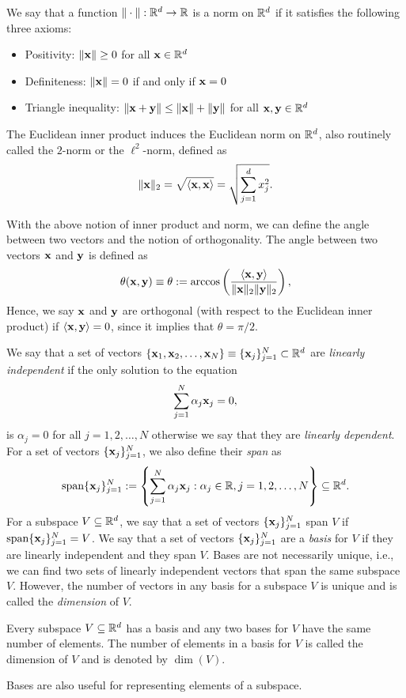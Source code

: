 \begin{definition}[Norm]
    We say that a function $\|\cdot\|: \mathbb{R}^d \to \mathbb{R}$ is a norm on $\mathbb{R}^d$ if it satisfies the following three axioms:
    \begin{itemize}
        \item Positivity: $\|\mathbf{x}\| \ge 0$ for all $\mathbf{x} \in \mathbb{R}^d$
        \item Definiteness: $\|\mathbf{x}\| = 0$ if and only if $\mathbf{x} = 0$
        \item Triangle inequality: $\|\mathbf{x} + \mathbf{y}\| \le \|\mathbf{x}\| + \|\mathbf{y}\|$ for all $\mathbf{x}, \mathbf{y} \in \mathbb{R}^d$
    \end{itemize}
\end{definition}
The Euclidean inner product induces the Euclidean norm on $\mathbb{R}^d$, 
also routinely called the $2$-norm or the $\ell^2$-norm, defined as
\begin{equation*}
    \|\mathbf{x}\|_2 = \sqrt{\langle \mathbf{x}, \mathbf{x} \rangle} = \sqrt{\sum_{j=1}^d x_j^2}.
\end{equation*}

With the above notion of inner product and norm, we can define the angle between two vectors and the notion of orthogonality.
The angle between two vectors $\mathbf{x}$ and $\mathbf{y}$ is defined as
\begin{equation*}
   \theta(\mathbf{x}, \mathbf{y}) \equiv \theta := \arccos \left( \frac{\langle \mathbf{x}, \mathbf{y} \rangle}{\|\mathbf{x}\|_2 \|\mathbf{y}\|_2} \right),
\end{equation*}
Hence, we say $\mathbf{x}$ and $\mathbf{y}$ are orthogonal (with respect to 
the Euclidean inner product) if $\langle \mathbf{x}, \mathbf{y} \rangle = 0$,
since it implies that $\theta = \pi/2$.

We say that a set of vectors $\{\mathbf{x}_1, \mathbf{x}_2, \ldots, \mathbf{x}_N\} \equiv 
\{ \mathbf{x}_j \}_{j=1}^N \subset \mathbb{R}^d$ 
are {\it linearly independent} if the only solution to the equation
\begin{equation*}
    \sum_{j=1}^N \alpha_j \mathbf{x}_j = 0,
\end{equation*}
is $\alpha_j = 0$ for all $j=1,2,\ldots,N$ otherwise we 
say that they are {\it linearly dependent}.
For a set of vectors $\{\mathbf{x}_j\}_{j=1}^N$, we also define their {\it span} as
\begin{equation*}
    \mathrm{span}\{\mathbf{x}_j\}_{j=1}^N := \left\{ \sum_{j=1}^N \alpha_j \mathbf{x}_j : \alpha_j \in \mathbb{R}, j=1,2,\ldots,N \right\} \subseteq \mathbb{R}^d.
\end{equation*}
For a subspace $V \subseteq \mathbb{R}^d$, we say that a set of vectors
$\{\mathbf{x}_j\}_{j=1}^N$ span $V$ if $\mathrm{span}\{\mathbf{x}_j\}_{j=1}^N = V$.
We say that a set of vectors $\{\mathbf{x}_j\}_{j=1}^N$ are a {\it basis} 
for $V$ if they are linearly independent and they span $V$. Bases are 
not necessarily unique, i.e., we can find two sets of linearly 
independent vectors that span the same subspace $V$. However,
the number of vectors in any basis for a subspace $V$ is unique and is called the {\it dimension} of $V$.
\begin{lemma}
    Every subspace $V \subseteq \mathbb{R}^d$ has a basis and any two bases for $V$ have the same number of elements. The number of elements in a basis for $V$ is called the dimension of $V$ and is denoted by $\dim(V)$.
\end{lemma}
Bases are also useful for representing elements of a subspace.

